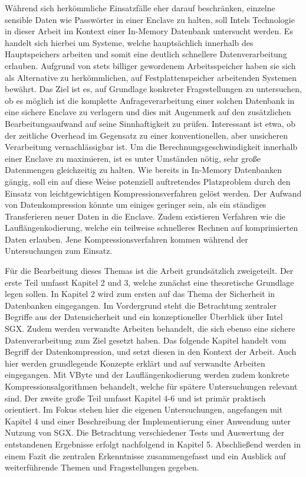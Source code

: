 Während sich herkömmliche Einsatzfälle eher darauf beschränken, einzelne sensible Daten wie Passwörter in einer Enclave zu halten, soll Intels Technologie in dieser Arbeit im Kontext einer In-Memory Datenbank untersucht werden. Es handelt sich hierbei um Systeme, welche hauptsächlich innerhalb des Hauptspeichers arbeiten und somit eine deutlich schnellere Datenverarbeitung erlauben. Aufgrund von stets billiger gewordenem Arbeitsspeicher haben sie sich als  Alternative zu herkömmlichen, auf Festplattenspeicher arbeitenden Systemen bewährt. Das Ziel ist es, auf Grundlage konkreter Fragestellungen zu untersuchen, ob es möglich ist die komplette Anfrageverarbeitung einer solchen Datenbank in eine sichere Enclave zu verlagern und dies mit Augenmerk auf den zusätzlichen Bearbeitungsaufwand auf seine Sinnhaftigkeit zu prüfen. Interessant ist etwa, ob der zeitliche Overhead im Gegensatz zu einer konventionellen, aber unsicheren Verarbeitung vernachlässigbar ist. Um die Berechnungsgeschwindigkeit innerhalb einer Enclave zu maximieren, ist es unter Umständen nötig, sehr große Datenmengen gleichzeitig zu halten. Wie bereits in In-Memory Datenbanken gängig, soll ein auf diese Weise potenziell auftretendes Platzproblem durch den Einsatz von leichtgewichtigen Kompressionsverfahren gelöst werden. Der Aufwand von Datenkompression könnte um einiges geringer sein, als ein ständiges Transferieren neuer Daten in die Enclave. Zudem existieren Verfahren wie die Lauflängenkodierung, welche ein teilweise schnelleres Rechnen auf komprimierten Daten erlauben. Jene Kompressionsverfahren kommen während der Untersuchungen zum Einsatz.

Für die Bearbeitung dieses Themas ist die Arbeit grundsätzlich zweigeteilt. Der erste Teil umfasst Kapitel 2 und 3, welche zunächst eine theoretische Grundlage legen sollen. In Kapitel 2 wird zum ersten auf das Thema der Sicherheit in Datenbanken eingegangen. Im Vordergrund steht die Betrachtung zentraler Begriffe aus der Datensicherheit und ein konzeptioneller Überblick über Intel SGX. Zudem werden verwandte Arbeiten behandelt, die sich ebenso eine sichere Datenverarbeitung zum Ziel gesetzt haben. Das folgende Kapitel handelt vom Begriff der Datenkompression, und setzt diesen in den Kontext der Arbeit. Auch hier werden grundlegende Konzepte erklärt und auf verwandte Arbeiten eingegangen. Mit VByte und der Lauflängenkodierung werden zudem konkrete Kompressionsalgorithmen behandelt, welche für spätere Untersuchungen relevant sind. Der zweite große Teil umfasst Kapitel 4-6 und ist primär praktisch orientiert. Im Fokus stehen hier die eigenen Untersuchungen, angefangen mit Kapitel 4 und einer Beschreibung der Implementierung einer Anwendung unter Nutzung von SGX. Die Betrachtung verschiedener Tests und Auswertung der entstandenen Ergebnisse erfolgt nachfolgend in Kapitel 5. Abschließend werden in einem Fazit die zentralen Erkenntnisse zusammengefasst und ein Ausblick auf weiterführende Themen und Fragestellungen gegeben.